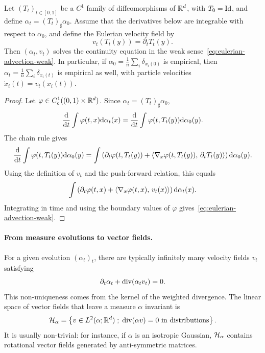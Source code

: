 \begin{prop}\label{prop-lagrangian-flow-continuity}
	Let $(T_t)_{t\in[0,1]}$ be a $C^1$ family of diffeomorphisms of $\mathbb{R}^d$, with $T_0=\mathrm{Id}$, and define $\alpha_t=(T_t)_\sharp\alpha_0$. Assume that the derivatives below are integrable with respect to $\alpha_0$, and define the Eulerian velocity field by
	\[
		v_t(T_t(y))=\partial_t T_t(y).
	\]
	Then $(\alpha_t,v_t)$ solves the continuity equation in the weak sense~\eqref{eq:eulerian-advection-weak}.
	In particular, if $\alpha_0=\frac1n\sum_i\delta_{x_i(0)}$ is empirical, then $\alpha_t=\frac1n\sum_i\delta_{x_i(t)}$ is empirical as well, with particle velocities $\dot x_i(t)=v_t(x_i(t))$.
\end{prop}

\begin{proof}
	Let $\varphi\in C_c^1((0,1)\times\mathbb{R}^d)$. Since $\alpha_t=(T_t)_\sharp\alpha_0$,
	\[
		\frac{\mathrm{d}}{\mathrm{d} t}\int \varphi(t,x)\mathrm{d}\alpha_t(x)
		=
		\frac{\mathrm{d}}{\mathrm{d} t}\int \varphi(t,T_t(y))\mathrm{d}\alpha_0(y).
	\]
	The chain rule gives
	\[
		\frac{\mathrm{d}}{\mathrm{d} t}\int \varphi(t,T_t(y))\mathrm{d}\alpha_0(y)
		=
		\int
		\left(
			\partial_t\varphi(t,T_t(y))
			+\langle \nabla_x\varphi(t,T_t(y)),\,\partial_t T_t(y)\rangle
		\right)
		\mathrm{d}\alpha_0(y).
	\]
	Using the definition of $v_t$ and the push-forward relation, this equals
	\[
		\int
		\left(
			\partial_t\varphi(t,x)+\langle \nabla_x\varphi(t,x),\,v_t(x)\rangle
		\right)
		\mathrm{d}\alpha_t(x).
	\]
	Integrating in time and using the boundary values of $\varphi$ gives~\eqref{eq:eulerian-advection-weak}.
\end{proof}

\paragraph{From measure evolutions to vector fields.}

For a given evolution $(\alpha_t)_t$, there are typically infinitely many velocity fields $v_t$ satisfying
\begin{equation}\label{eq:inverse-flow}
	\partial_t\alpha_t+\operatorname{div}(\alpha_t v_t)=0.
\end{equation}
This non-uniqueness comes from the kernel of the weighted divergence. The linear space of vector fields that leave a measure $\alpha$ invariant is
\[
	\mathcal{H}_\alpha=\left\{ v\in L^2(\alpha;\mathbb{R}^d) \;;\; \operatorname{div}(\alpha v)=0\ \text{in distributions} \right\}.
\]
It is usually non-trivial: for instance, if $\alpha$ is an isotropic Gaussian, $\mathcal{H}_\alpha$ contains rotational vector fields generated by anti-symmetric matrices.

